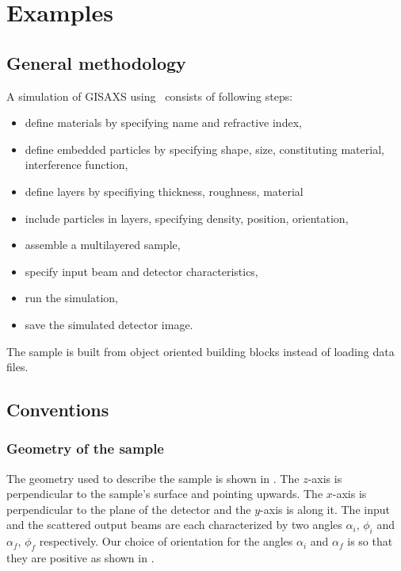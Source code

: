\chapter{Examples}  \label{ExamplesChapter}

\section{General methodology}
A simulation of GISAXS using \BornAgain\ consists of following steps:
\begin{itemize}
\item define materials by specifying name and refractive index,
\item define embedded particles by specifying shape, size,
   constituting material, interference function,
\item define layers by specifiying thickness, roughness, material
\item include particles in layers, specifying density, position, orientation, 
\item assemble a multilayered sample,
\item specify input beam and detector characteristics,
\item run the simulation,
\item save the simulated detector image.
\end{itemize}

\noindent The sample is built from object oriented building blocks instead of loading data files.

\section{Conventions}

\subsection{Geometry of the sample}

\noindent The geometry used to describe the sample is shown in . The $z$-axis is perpendicular to the sample's
surface and pointing upwards. The $x$-axis  is perpendicular to the
plane of the detector and the $y$-axis is along it. The input and the
scattered output beams are each characterized by two angles
$\alpha_i$, $\phi_i$ and $\alpha_f$, $\phi_f$ respectively. Our choice of orientation for the
angles $\alpha_i$ and $\alpha_f$ is so that they are positive as shown in . \\


